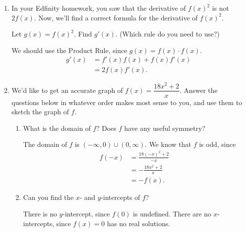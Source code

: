 \documentclass{article}
\begin{document}
\begin{enumerate}[resume, topsep=0pt]
\begin{enumerate}
  \end{enumerate}

\item 
  \begin{problem}[1in]
    In your Edfinity homework, you saw that the derivative of $f(x)^2$ is not $2 f(x)$. Now, we'll find a correct formula for the derivative of $f(x)^2$.

    Let $g(x) = f(x)^2$. Find $g'(x)$. (Which rule do you need to use?)
  \end{problem}

  \begin{solution}
    We should use the Product Rule, since $g(x) = f(x) \cdot f(x)$. 
    \begin{align*}
        g'(x) &= f'(x)f(x) + f(x)f'(x) \\
        &= 2f(x)f'(x).
    \end{align*}
  \end{solution}

\item  \label{graphing-worksheet-odd}

  We'd like to get an accurate graph of $f(x) = \dfrac{18 x^2 + 2}{x}$. Answer the questions below in whatever order makes most sense to you, and use them to sketch the graph of $f$.
  \begin{enumerate}

  \item
    \begin{problem}[\vfill]
      What is the domain of $f$? Does $f$ have any useful symmetry?
    \end{problem}

    \begin{solution}
      The domain of $f$ is $(-\infty, 0) \cup (0, \infty)$. We know that $f$ is odd, since
      \begin{align*}
        f(-x) &= \frac{18(-x)^2 + 2}{-x} \\
        &= -\frac{18x^2 + 2}{x} \\
        &= -f(x).
      \end{align*}
    \end{solution}

  \item
    \begin{problem}[\stretch{0.75}]
      Can you find the $x$- and $y$-intercepts of $f$?
    \end{problem}

    \begin{solution}
      There is no $y$-intercept, since $f(0)$ is undefined. There are no $x$-intercepts,
      since $f(x)=0$ has no real solutions.
    \end{solution}


\end{enumerate}
\end{enumerate}
\end{document}
